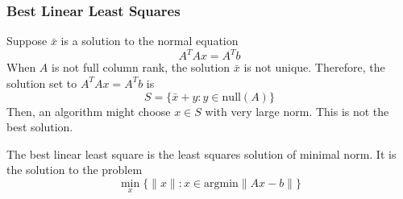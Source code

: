 \subsubsection{Best Linear Least Squares}
Suppose $\bar x$ is a solution to the normal equation $$A^TAx = A^Tb$$ When $A$ is not full column rank, the solution $\bar x$ is not unique. Therefore, the solution set to $A^T Ax = A^T b$ is $$S = \{\bar x + y: y \in \text{null}(A)\}$$
Then, an algorithm might choose $x \in S$ with very large norm. This is not the best solution.
\begin{definition}
  The best linear least square is the least squares solution of minimal norm. It is the solution to the problem
  $$\min_x \{\|x\|: x \in \text{argmin}\|Ax - b\|\}$$
\end{definition}

